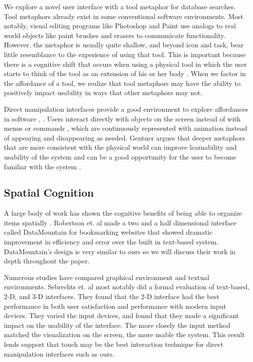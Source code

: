 \documentclass{article}
\begin{document}
We explore a novel user interface with a tool metaphor for database searches.  Tool metaphors already exist in some conventional software environments.  Most notably, visual editing programs like Photoshop and Paint use analogs to real world objects like paint brushes and erasers to communicate functionality.  However, the metaphor is usually quite shallow, and beyond icon and task, bear little resemblance to the experience of using that tool.  This is important because there is a cognitive shift that occurs when using a physical tool in which the user starts to think of the tool as an extension of his or her body  \cite{Maravita2004}.  When we factor in the affordance of a tool, we realize that tool metaphors may have the ability to positively impact usability in ways that other metaphors may not.  

Direct manipulation interfaces provide a good environment to explore affordances in software \cite{Gaver1991}, \cite{Norman1991}.  Users interact directly with objects on the screen instead of with menus or commands \cite{Hutchins1989} \cite{Shneiderman1992}, which are continuously represented with animation instead of appearing and disappearing as needed\cite{Shneiderman1992}.  Gentner argues that deeper metaphors that are more consistent with the physical world can improve learnability and usability of the system \cite{Gentner1996} and can be a good opportunity for the user to become familiar with the system \cite{Fischer1994}.  


\subsection{Spatial Cognition}
A large body of work has shown the cognitive benefits of being able to organize items spatially \cite{Agarawala2006} \cite{Robertson1998}. Robertson et. al made a two and a half dimensional interface called DataMountain for bookmarking websites that showed dramatic improvement in efficiency and error over the built in text-based system.  DataMountain's design is very similar to ours so we will discuss their work in depth throughout the paper.    
	
	Numerous studies have compared graphical environment and textual environments.  Sebrechts et. al most notably did a formal evaluation of text-based, 2-D, and 3-D interfaces.\cite{Sebrechts1999}  They found that the 2-D interface had the best performance in both user satisfaction and performance with modern input devices.  They varied the input devices, and found that they made a significant impact on the usability of the interface. The more closely the input method matched the visualization on the screen, the more usable the system.  This result lends support that touch may be the best interaction technique for direct manipulation interfaces such as ours.  
\end{document}
